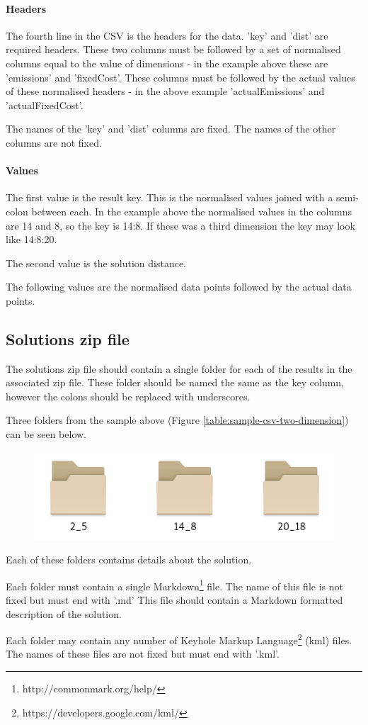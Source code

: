 \paragraph{Headers}  The fourth line in the CSV is the headers for the data.  'key' and 'dist' are required headers.  These two columns must be followed by a set of normalised columns equal to the value of dimensions - in the example above these are 'emissions' and 'fixedCost'.  These columns must be followed by the actual values of these normalised headers - in the above example 'actualEmissions' and 'actualFixedCost'.

The names of the 'key' and 'dist' columns are fixed.  The names of the other columns are not fixed.

\paragraph{Values}  The first value is the result key.  This is the normalised values joined with a semi-colon between each.  In the example above the normalised values in the columns are 14 and 8, so the key is 14:8.  If these was a third dimension the key may look like 14:8:20.

The second value is the solution distance.

The following values are the normalised data points followed by the actual data points.

\subsection{Solutions zip file} \label{section:file-format-solutions-zip}

The solutions zip file should contain a single folder for each of the results in the associated zip file.  These folder should be named the same as the key column, however the colons should be replaced with underscores.

Three folders from the sample above (Figure \ref{table:sample-csv-two-dimension}) can be seen below.

\begin{figure}[h]
	\includegraphics[width=\linewidth]{images/solution-zip-folders.png}
	\label{img:solution-zip-folders}
\end{figure}

Each of these folders contains details about the solution.

Each folder must contain a single Markdown\footnote{http://commonmark.org/help/} file.  The name of this file is not fixed but must end with '.md'  This file should contain a Markdown formatted description of the solution.

Each folder may contain any number of Keyhole Markup Language\footnote{https://developers.google.com/kml/} (kml) files.  The names of these files are not fixed but must end with '.kml'.
